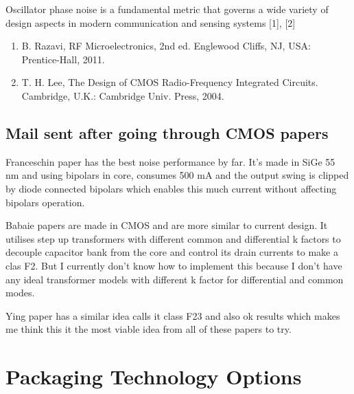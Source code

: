 \documentclass{article}
\begin{document}
Oscillator phase noise is a fundamental metric that governs a wide variety of design aspects in modern communication and sensing systems [1], [2]

\begin{enumerate} %
	\item B. Razavi, RF Microelectronics, 2nd ed. Englewood Cliffs, NJ, USA: Prentice-Hall, 2011. 
	\item T. H. Lee, The Design of CMOS Radio-Frequency Integrated Circuits. Cambridge, U.K.: Cambridge Univ. Press, 2004.
\end{enumerate}


\subsection{Mail sent after going through CMOS papers}


Franceschin paper has the best noise performance by far. It's made in SiGe 55 nm and using bipolars in core, consumes 500 mA and the output swing is clipped by diode connected bipolars which enables this much current without affecting bipolars operation.

Babaie papers are made in CMOS and are more similar to current design. It utilises step up transformers with different common and differential k factors to decouple capacitor bank from the core and control its drain currents to make a clas F2. But I currently don't know how to implement this because I don't have any ideal transformer models with different k factor for differential and common modes.

Ying paper has a similar idea calls it class F23 and also ok results which makes me think this it the most viable idea from all of these papers to try.


\section{Packaging Technology Options}
\end{document}
